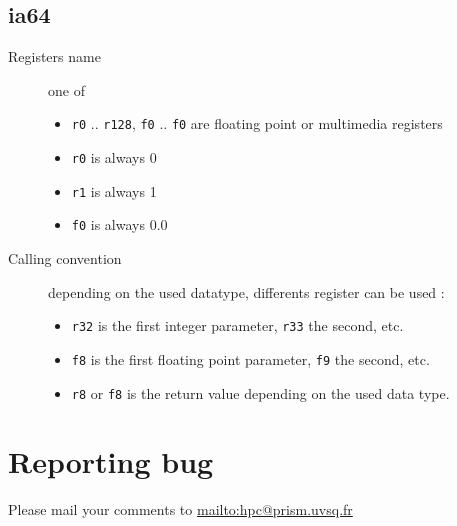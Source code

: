 \documentclass{article}
\begin{document}
\subsection{ia64}
\begin{description}
\item[Registers name] one of
  \begin{itemize}
  \item \verb|r0| .. \verb|r128|, \verb|f0| .. \verb|f0| are floating
    point or multimedia registers
  \item \verb|r0| is always 0
  \item \verb|r1| is always 1
  \item \verb|f0| is always 0.0
  \end{itemize}
\item[Calling convention] depending on the used datatype, differents
  register can be used :
  \begin{itemize}
  \item \verb|r32| is the first integer parameter, \verb|r33| the
    second, etc.
  \item \verb|f8| is the first floating point parameter, \verb|f9| the
    second, etc.
  \item \verb|r8| or \verb|f8| is the return value depending on the
    used data type.
  \end{itemize}
\end{description}

\section{Reporting bug}

Please mail your comments to \url{mailto:hpc@prism.uvsq.fr}



\end{document}
